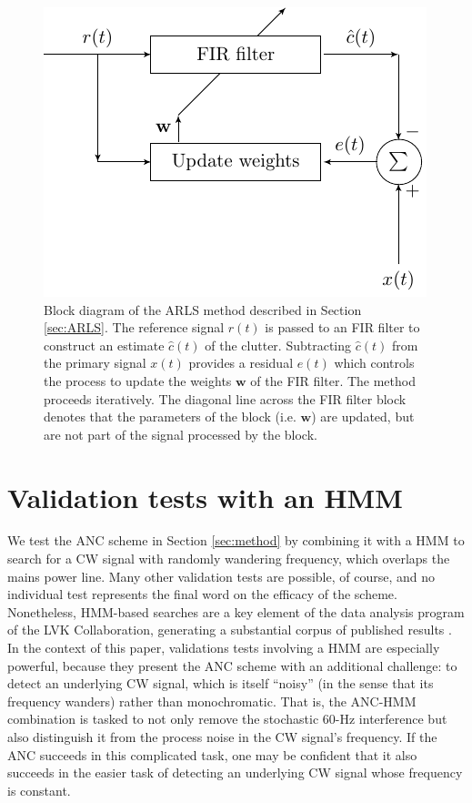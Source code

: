 \documentclass[pra,superscriptaddress,reprint,amsmath,amssymb,nofootinbib]{revtex4-2}
\begin{document}
\begin{figure}
	\begin{center}
		\includegraphics[width=\columnwidth]{images/fir_block_2.pdf}
	\end{center}
	\caption{Block diagram of the ARLS method described in Section \ref{sec:ARLS}. The reference signal $r(t)$ is passed to an FIR filter to construct an estimate $\hat{c}(t)$ of the clutter. Subtracting $\hat{c}(t)$ from the primary signal $x(t)$ provides a residual $e(t)$ which controls the process to update the weights $\mathbf{w}$ of the FIR filter. The method proceeds iteratively. The diagonal line across the FIR filter block denotes that the parameters of the block (i.e. $\mathbf{w}$) are updated, but are not part of the signal processed by the block.}
	\label{fig:arlsBlock}
\end{figure}

\section{Validation tests with an HMM} \label{sec:results}
We test the ANC scheme in Section \ref{sec:method} by combining it with a HMM to search for a CW signal with randomly wandering frequency, which overlaps the mains power line. Many other validation tests are possible, of course, and no individual test represents the final word on the efficacy of the scheme. Nonetheless, HMM-based searches are a key element of the data analysis program of the LVK Collaboration, generating a substantial corpus of published results \citep{LIGOMarkov17,LIGOMarkov19,PhysRevD.99.084042,2018PhRvD..97d3013S,LIGOMarkov22,2023PhRvD.107f4062V}. In the context of this paper, validations tests involving a HMM are especially powerful, because they present the ANC scheme with an additional challenge: to detect an underlying CW signal, which is itself ``noisy'' (in the sense that its frequency wanders) rather than monochromatic. That is, the ANC-HMM combination is tasked to not only remove the stochastic 60-Hz interference but also distinguish it from the process noise in the CW signal's frequency. If the ANC succeeds in this complicated task, one may be confident that it also succeeds in the easier task of detecting an underlying CW signal whose frequency is constant.  \newline 
\end{document}
